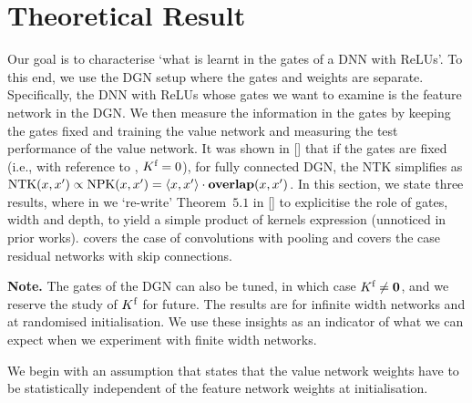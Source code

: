 \section{Theoretical Result}\label{sec:fc}
Our goal is to characterise `what is learnt in the gates of a DNN with ReLUs'. To this end, we use the DGN setup where the gates and weights are separate. Specifically, the DNN with ReLUs whose gates we want to examine is the feature network in the DGN. We then measure the information in the gates by keeping the gates fixed and training the value network and measuring the test performance of the value network. It was shown in [] that if the gates are fixed  (i.e., with reference to , $K^{\text{f}}=0$), for fully connected DGN, the NTK simplifies as $\text{NTK}(x,x')\propto \text{NPK}(x,x') = \langle x,x'\rangle\cdot {\bf{overlap}}(x,x')$. In this section, we state three results, where in  we `re-write' Theorem~$5.1$ in [] to explicitise the role of gates, width and depth, to yield a simple product of kernels expression (unnoticed in prior works).   covers the case of convolutions with pooling and  covers the case residual networks with skip connections.

\textbf{Note.} The gates of the DGN can also be tuned, in which case $K^{\text{f}}\neq \mathbf{0}$, and we reserve the study of $K^{\text{f}}$ for future. The results are for infinite width networks and at randomised initialisation. We use these insights as an indicator of what we can expect when we experiment with finite width networks. 

We begin with an assumption that states that the value network weights have to be statistically independent of the feature network weights at initialisation. %


